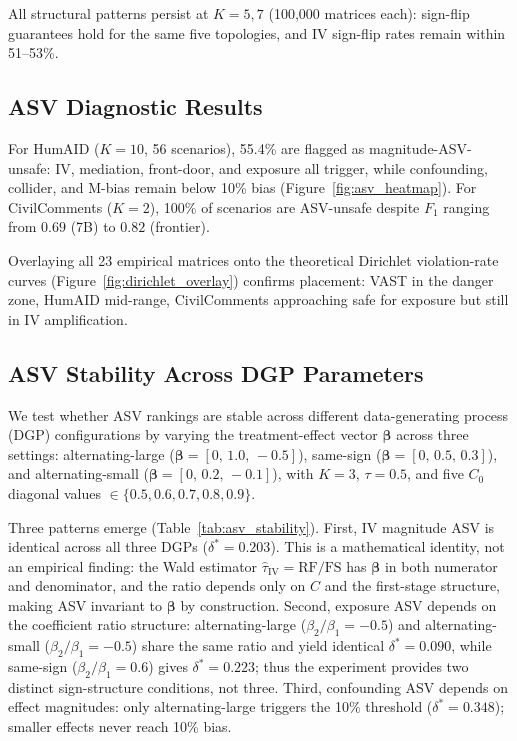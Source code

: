 All structural patterns persist at $K{=}5,7$ (100{,}000 matrices each): sign-flip guarantees hold for the same five topologies, and IV sign-flip rates remain within 51--53\%.

\subsection{ASV Diagnostic Results}
\label{sec:asv_diagnostics}

For HumAID ($K{=}10$, 56 scenarios), 55.4\% are flagged as magnitude-ASV-unsafe: IV, mediation, front-door, and exposure all trigger, while confounding, collider, and M-bias remain below 10\% bias (Figure~\ref{fig:asv_heatmap}). For CivilComments ($K{=}2$), 100\% of scenarios are ASV-unsafe despite $F_1$ ranging from $0.69$ (7B) to $0.82$ (frontier).

Overlaying all 23 empirical matrices onto the theoretical Dirichlet violation-rate curves (Figure~\ref{fig:dirichlet_overlay}) confirms placement: VAST in the danger zone, HumAID mid-range, CivilComments approaching safe for exposure but still in IV amplification.

\subsection{ASV Stability Across DGP Parameters}
\label{sec:asv_stability}

We test whether ASV rankings are stable across different data-generating process (DGP) configurations by varying the treatment-effect vector $\boldsymbol{\beta}$ across three settings: alternating-large ($\boldsymbol{\beta}=[0,\,1.0,\,-0.5]$), same-sign ($\boldsymbol{\beta}=[0,\,0.5,\,0.3]$), and alternating-small ($\boldsymbol{\beta}=[0,\,0.2,\,-0.1]$), with $K{=}3$, $\tau{=}0.5$, and five $C_0$ diagonal values $\in\{0.5,0.6,0.7,0.8,0.9\}$.



Three patterns emerge (Table~\ref{tab:asv_stability}). First, IV magnitude ASV is identical across all three DGPs ($\delta^*{=}0.203$). This is a mathematical identity, not an empirical finding: the Wald estimator $\hat{\tau}_{\text{IV}} = \text{RF}/\text{FS}$ has $\boldsymbol{\beta}$ in both numerator and denominator, and the ratio depends only on $C$ and the first-stage structure, making ASV invariant to $\boldsymbol{\beta}$ by construction. Second, exposure ASV depends on the coefficient ratio structure: alternating-large ($\beta_2/\beta_1 = -0.5$) and alternating-small ($\beta_2/\beta_1 = -0.5$) share the same ratio and yield identical $\delta^*{=}0.090$, while same-sign ($\beta_2/\beta_1 = 0.6$) gives $\delta^*{=}0.223$; thus the experiment provides two distinct sign-structure conditions, not three. Third, confounding ASV depends on effect magnitudes: only alternating-large triggers the 10\% threshold ($\delta^*{=}0.348$); smaller effects never reach 10\% bias.

